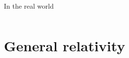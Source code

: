 \documentclass{beamer}
\begin{document}
\begin{frame}{In the real world}
\begin{columns}[t]
\begin{column}{0.6\textwidth}
      
      
    \end{column}
  \end{columns}
\end{frame}

\section{General relativity}
\end{document}
